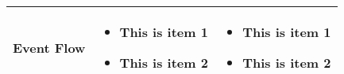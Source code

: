 \documentclass{article}
\begin{document}
\begin{tabular}{|l|p{5cm}| p{5cm}| }
  \hline
  Event Flow &
    \begin{itemize} [topsep=0pt, partopsep=0pt]
      \item This is item 1
      \item This is item 2
    \end{itemize} 
    &
    \begin{itemize}
      \item This is item 1
      \item This is item 2
    \end{itemize} \\

  \hline
 \end{tabular}
\end{document}
